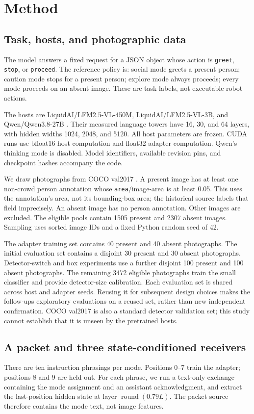 \documentclass[10pt]{article}
\begin{document}
\section{Method}
\subsection{Task, hosts, and photographic data}
The model answers a fixed request for a JSON object whose action is
\texttt{greet}, \texttt{stop}, or \texttt{proceed}. The reference policy is:
social mode greets a present person; caution mode stops for a present
person; explore mode always proceeds; every mode proceeds on an absent
image. These are task labels, not executable robot actions.

The hosts are LiquidAI/LFM2.5-VL-450M, LiquidAI/LFM2.5-VL-3B, and
Qwen/Qwen3.8-27B \citep{liquid450,liquid3b,qwen27}. Their measured language
towers have 16, 30, and 64 layers, with hidden widths 1024, 2048, and
5120. All host parameters are frozen. CUDA runs use bfloat16 host
computation and float32 adapter computation. Qwen's thinking mode is
disabled. Model identifiers, available revision pins, and checkpoint
hashes accompany the code.

We draw photographs from COCO val2017 \citep{lin2014coco}. A present
image has at least one non-crowd person annotation whose
\texttt{area}/image-area is at least 0.05. This uses the annotation's
area, not its bounding-box area; the historical source labels that field
imprecisely. An absent image has no person annotation. Other images are
excluded. The eligible pools contain 1505 present and 2307 absent images.
Sampling uses sorted image IDs and a fixed Python random seed of 42.

The adapter training set contains 40 present and 40 absent photographs.
The initial evaluation set contains a disjoint 30 present and 30 absent
photographs. Detector-switch and box experiments use a further disjoint
100 present and 100 absent photographs. The remaining 3472 eligible
photographs train the small classifier and provide detector-size
calibration. Each evaluation set is shared across host and adapter
seeds. Reusing it for subsequent design choices makes the follow-ups
exploratory evaluations on a reused set, rather than new independent
confirmation. COCO val2017 is also a standard detector validation set;
this study cannot establish that it is unseen by the pretrained hosts.

\subsection{A packet and three state-conditioned receivers}
There are ten instruction phrasings per mode. Positions 0--7 train the
adapter; positions 8 and 9 are held out. For each phrase, we run a
text-only exchange containing the mode assignment and an assistant
acknowledgment, and extract the last-position hidden state at layer
$\operatorname{round}(0.79L)$. The packet source therefore contains the
mode text, not image features.
\end{document}

